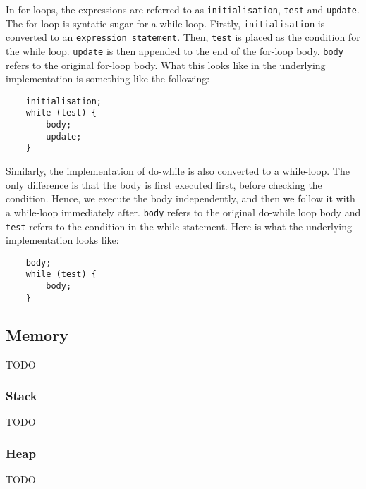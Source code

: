 \documentclass[a4paper]{article}
\begin{document}
In for-loops, the expressions are referred to as \texttt{initialisation}, \texttt{test} and \texttt{update}. The for-loop is syntatic sugar for a while-loop. Firstly, \texttt{initialisation} is converted to an \texttt{expression statement}. Then, \texttt{test} is placed as the condition for the while loop. \texttt{update} is then appended to the end of the for-loop body. \texttt{body} refers to the original for-loop body. What this looks like in the underlying implementation is something like the following:


\begin{verbatim}
	initialisation;
	while (test) {
		body;
		update;
	}
\end{verbatim}

Similarly, the implementation of do-while is also converted to a while-loop. The only difference is that the body is first executed first, before checking the condition. Hence, we execute the body independently, and then we follow it with a while-loop immediately after. \texttt{body} refers to the original do-while loop body and \texttt{test} refers to the condition in the while statement. Here is what the underlying implementation looks like:

\begin{verbatim}
	body;
	while (test) {
		body;
	}
\end{verbatim}




\subsection{Memory}

TODO

\subsubsection{Stack}

TODO

\subsubsection{Heap}

TODO
\end{document}
